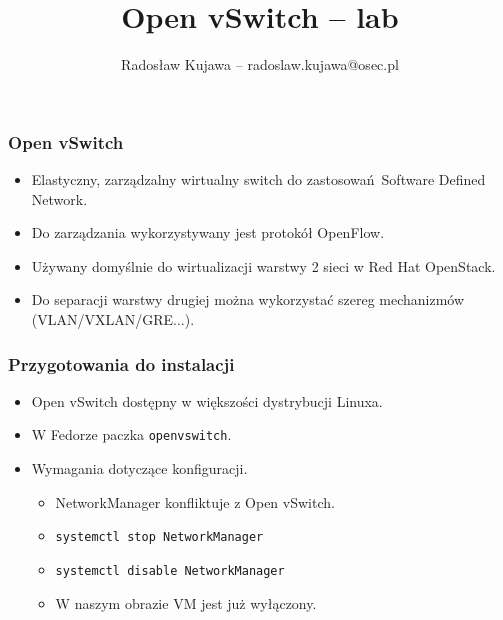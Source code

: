 \documentclass[dvipsnames,table]{beamer}
\title{Open vSwitch -- lab}
\author{Radosław Kujawa -- radoslaw.kujawa@osec.pl}
\institute{OSEC}
\begin{document}
\begin{frame}
	\titlepage
\end{frame}

\begin{frame}
\frametitle{Open vSwitch}
\begin{itemize}
	\item Elastyczny, zarządzalny wirtualny switch do zastosowań Software Defined Network.
	\item Do zarządzania wykorzystywany jest protokół OpenFlow.
	\item Używany domyślnie do wirtualizacji warstwy 2 sieci w Red Hat OpenStack.
	\item Do separacji warstwy drugiej można wykorzystać szereg mechanizmów (VLAN/VXLAN/GRE...).
\end{itemize}
\end{frame}

\begin{frame}
\frametitle{Przygotowania do instalacji}
\begin{itemize}
	\item Open vSwitch dostępny w większości dystrybucji Linuxa.
	\item W Fedorze paczka {\tt openvswitch}.
	\item Wymagania dotyczące konfiguracji.
	\begin{itemize}
		\item NetworkManager konfliktuje z Open vSwitch.
		\item {\tt systemctl stop NetworkManager}
		\item {\tt systemctl disable NetworkManager}
		\item W naszym obrazie VM jest już wyłączony.
	\end{itemize}
\end{itemize}
\end{frame}
\end{document}
